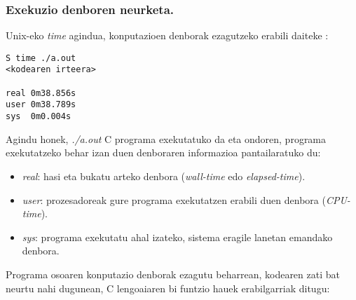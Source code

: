 \subsubsection*{Exekuzio denboren neurketa.}

Unix-eko \emph{time} agindua, konputazioen denborak ezagutzeko erabili daiteke \cite{Pacheco2011}:

\begin{lstlisting} 
S time ./a.out
<kodearen irteera>

real 0m38.856s
user 0m38.789s
sys  0m0.004s
\end{lstlisting}

Agindu honek, \emph{./a.out} C programa exekutatuko da eta ondoren, programa exekutatzeko behar izan duen denboraren informazioa pantailaratuko du:
\begin{itemize}
\item  \emph{real}: hasi eta bukatu arteko denbora (\emph{wall-time} edo \emph{elapsed-time}).
\item \emph{user}:  prozesadoreak gure programa exekutatzen erabili duen denbora (\emph{CPU-time}).
\item \emph{sys}:  programa exekutatu ahal izateko, sistema eragile lanetan emandako denbora. 
\end{itemize}

Programa osoaren konputazio denborak ezagutu beharrean, kodearen zati bat neurtu nahi dugunean, C lengoaiaren bi funtzio hauek erabilgarriak ditugu:

